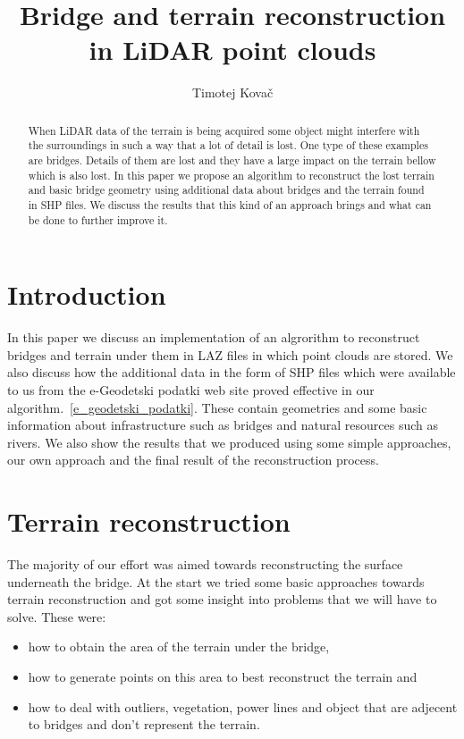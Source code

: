 \documentclass{egpubl-eurovis-star}
\title[EG \LaTeX\ Author Guidelines]%
      {Bridge and terrain reconstruction in LiDAR point clouds}
\author[submission ID]{Timotej Kovač}
\begin{document}

\maketitle

\begin{abstract}
When LiDAR data of the terrain is being acquired some object might interfere with the surroundings in such a way that a lot of detail is lost.
One type of these examples are bridges.
Details of them are lost and they have a large impact on the terrain bellow which is also lost.
In this paper we propose an algorithm to reconstruct the lost terrain and basic bridge geometry using additional data about bridges and the terrain found in SHP files.
We discuss the results that this kind of an approach brings and what can be done to further improve it.
\end{abstract}



\section{Introduction}
In this paper we discuss an implementation of an algrorithm to reconstruct bridges and terrain under them in LAZ files in which point clouds are stored.
We also discuss how the additional data in the form of SHP files which were available to us from the e-Geodetski podatki web site proved effective in our algorithm.~\ref{e_geodetski_podatki}.
These contain geometries and some basic information about infrastructure such as bridges and natural resources such as rivers.
We also show the results that we produced using some simple approaches, our own approach and the final result of the reconstruction process.

\section{Terrain reconstruction}

The majority of our effort was aimed towards reconstructing the surface underneath the bridge.
At the start we tried some basic approaches towards terrain reconstruction and got some insight into problems that we will have to solve.
These were:
\begin{itemize}
\item{how to obtain the area of the terrain under the bridge,}
\item{how to generate points on this area to best reconstruct the terrain and}
\item{how to deal with outliers, vegetation, power lines and object that are adjecent to bridges and don't represent the terrain.}
\end{itemize}
\end{document}
